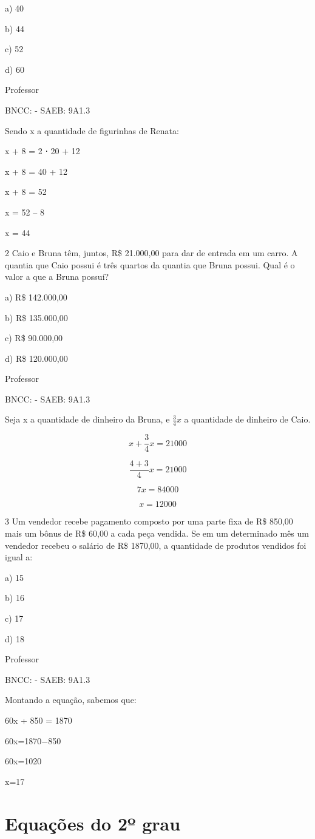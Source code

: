 \begin{escolha}
{{{\begin{escolha}
{a) 40

b) 44

c) 52

d) 60

Professor

BNCC: - SAEB: 9A1.3

Sendo x a quantidade de figurinhas de Renata:

x + 8 = 2 ⋅ 20 + 12

x + 8 = 40 + 12

x + 8 = 52

x = 52 -- 8

x = 44

\num{2} Caio e Bruna têm, juntos, R\$ 21.000,00 para dar de entrada em um
carro. A quantia que Caio possui é três quartos da quantia que Bruna
possui. Qual é o valor a que a Bruna possuí?

a) R\$ 142.000,00

b) R\$ 135.000,00

c) R\$ 90.000,00

d) R\$ 120.000,00

Professor

BNCC: - SAEB: 9A1.3

Seja x a quantidade de dinheiro da Bruna, e \(\frac{3}{4}x\) a
quantidade de dinheiro de Caio.

\[x + \frac{3}{4}x = 21000\]

\[\frac{4 + 3}{4}x = 21000\]

\[7x = 84000\]

\[x = 12000\]

\num{3} Um vendedor recebe pagamento composto por uma parte fixa de R\$
850,00 mais um bônus de R\$ 60,00 a cada peça vendida. Se em um
determinado mês um vendedor recebeu o salário de R\$ 1870,00, a
quantidade de produtos vendidos foi igual a:

a) 15

b) 16

c) 17

d) 18

Professor

BNCC: - SAEB: 9A1.3

Montando a equação, sabemos que:

60x + 850 = 1870

60x=1870−850

60x=1020

x=17

\pagestyle{mat}
\chapter{Equações do 2º grau}

}
\end{escolha}}}}
\end{escolha}
